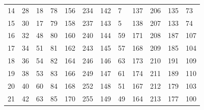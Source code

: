 \begin{table}[]
\begin{tabular}{llllllllllll}
14                     & 28                     & 18                     & 78                     & 156                    & 234                    & 142                    & 7                      & 137                    & 206                    & 135                    & 73                     \\
15                     & 30                     & 17                     & 79                     & 158                    & 237                    & 143                    & 5                      & 138                    & 207                    & 133                    & 74                     \\
16                     & 32                     & 48                     & 80                     & 160                    & 240                    & 144                    & 59                     & 171                    & 208                    & 187                    & 107                    \\
17                     & 34                     & 51                     & 81                     & 162                    & 243                    & 145                    & 57                     & 168                    & 209                    & 185                    & 104                    \\
18                     & 36                     & 54                     & 82                     & 164                    & 246                    & 146                    & 63                     & 173                    & 210                    & 191                    & 109                    \\
19                     & 38                     & 53                     & 83                     & 166                    & 249                    & 147                    & 61                     & 174                    & 211                    & 189                    & 110                    \\
20                     & 40                     & 60                     & 84                     & 168                    & 252                    & 148                    & 51                     & 167                    & 212                    & 179                    & 103                    \\
21                     & 42                     & 63                     & 85                     & 170                    & 255                    & 149                    & 49                     & 164                    & 213                    & 177                    & 100                    \\

\end{tabular}
\end{table}
